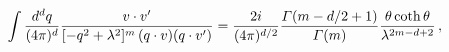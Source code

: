\begin{equation}
\int \frac{d^d q}{(4 \pi)^d}
\frac{v \cdot v'}{[- q^2 + \lambda^2]^m \, (q \cdot v) (q \cdot v')}
=
\frac{2 i}{(4 \pi)^{d/2}} \frac{{\mit\Gamma} (m - d/2 + 1)}{{\mit\Gamma} (m)}
\frac{\theta\coth \theta}{\lambda^{2 m - d + 2}}
\, ,
\end{equation}


